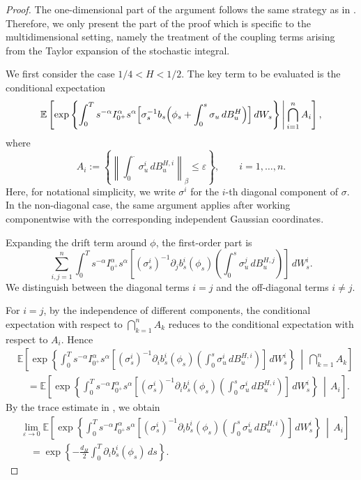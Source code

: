 \documentclass[preprint,12pt]{elsarticle}
\theoremstyle{definition}
\theoremstyle{plain}
\begin{document}
\begin{proof}
The one-dimensional part of the argument follows the same strategy as in
\cite{Nualart}. Therefore, we only present the part of the proof which is
specific to the multidimensional setting, namely the treatment of the coupling
terms arising from the Taylor expansion of the stochastic integral.

We first consider the case \(1/4<H<1/2\). 
The key term to be evaluated is the conditional expectation
\begin{equation*}
\mathbb E
\left[
\exp\left\{
\int_0^T
s^{-\alpha}I_{0^+}^{\alpha}s^\alpha
\Bigl[
    \sigma_s^{-1}
    b_s\Bigl(
        \phi_s+\int_0^s\sigma_u\,dB_u^H
    \Bigr)
\Bigr]
\,dW_s
\right\}
\,\middle|\,
\bigcap_{i=1}^n A_i
\right],
\end{equation*}
where
\[
    A_i
    :=
    \left\{
    \left\|
    \int_0^\cdot \sigma_u^i\,dB_u^{H,i}
    \right\|_\beta
    \leq \varepsilon
    \right\},
    \qquad i=1,\dots,n .
\]
Here, for notational simplicity, we write \(\sigma^i\) for the \(i\)-th
diagonal component of \(\sigma\). In the non-diagonal case, the same argument
applies after working componentwise with the corresponding independent
Gaussian coordinates.

Expanding the drift term around \(\phi\), the first-order part is
\begin{equation*}
\sum_{i,j=1}^n
\int_0^T
s^{-\alpha}I_{0^+}^{\alpha}s^\alpha
\left[
    (\sigma_s^i)^{-1}
    \partial_j b_s^i(\phi_s)
    \left(
        \int_0^s \sigma_u^j\,dB_u^{H,j}
    \right)
\right]
\,dW_s^i .
\end{equation*}
We distinguish between the diagonal terms \(i=j\) and the off-diagonal terms
\(i\neq j\).

For \(i=j\), by the independence of different components, the conditional
expectation with respect to \(\bigcap_{k=1}^n A_k\) reduces to the conditional
expectation with respect to \(A_i\). Hence
\begin{align*}
&\mathbb E
\left[
\exp\left\{
\int_0^T
s^{-\alpha}I_{0^+}^{\alpha}s^\alpha
\left[
    (\sigma_s^i)^{-1}
    \partial_i b_s^i(\phi_s)
    \left(
        \int_0^s \sigma_u^i\,dB_u^{H,i}
    \right)
\right]
\,dW_s^i
\right\}
\,\middle|\,
\bigcap_{k=1}^n A_k
\right]
\nonumber \\
&\quad =
\mathbb E
\left[
\exp\left\{
\int_0^T
s^{-\alpha}I_{0^+}^{\alpha}s^\alpha
\left[
    (\sigma_s^i)^{-1}
    \partial_i b_s^i(\phi_s)
    \left(
        \int_0^s \sigma_u^i\,dB_u^{H,i}
    \right)
\right]
\,dW_s^i
\right\}
\,\middle|\,
A_i
\right].
\end{align*}
By the trace estimate in \cite{Nualart}, we obtain
\begin{align*}
&\lim_{\varepsilon\to0}
\mathbb E
\left[
\exp\left\{
\int_0^T
s^{-\alpha}I_{0^+}^{\alpha}s^\alpha
\left[
    (\sigma_s^i)^{-1}
    \partial_i b_s^i(\phi_s)
    \left(
        \int_0^s \sigma_u^i\,dB_u^{H,i}
    \right)
\right]
\,dW_s^i
\right\}
\,\middle|\,
A_i
\right]
\nonumber \\
&\quad =
\exp\left\{
-\frac{d_H}{2}
\int_0^T \partial_i b_s^i(\phi_s)\,ds
\right\}.
\end{align*}


\end{proof}
\end{document}
